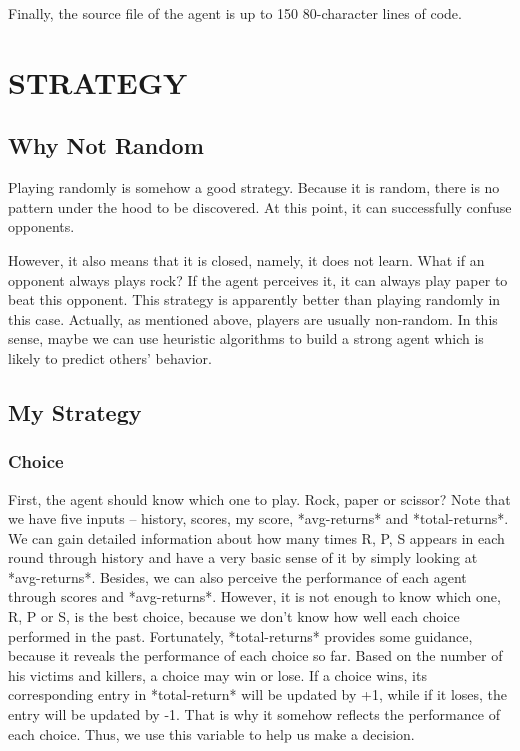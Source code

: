 \documentclass[10pt]{article}
\begin{document}
Finally, the source file of the agent is up to 150 80-character lines of code.

\section{STRATEGY}
\subsection{Why Not Random}
Playing randomly is somehow a good strategy. Because it is random, there is no pattern under the hood to be discovered. At this point, it can successfully confuse opponents. 

However, it also means that it is closed, namely, it does not learn. What if an opponent always plays rock? If the agent perceives it, it can always play paper to beat this opponent. This strategy is apparently better than playing randomly in this case. Actually, as mentioned above, players are usually non-random. In this sense, maybe we can use heuristic algorithms to build a strong agent which is likely to predict others' behavior.

\subsection{My Strategy}

\subsubsection{Choice}
First, the agent should know which one to play. Rock, paper or scissor? Note that we have five inputs -- history, scores, my score, *avg-returns* and *total-returns*. We can gain detailed information about how many times R, P, S appears in each round through history and have a very basic sense of it by simply looking at *avg-returns*. Besides, we can also perceive the performance of each agent through scores and *avg-returns*. However, it is not enough to know which one, R, P or S, is the best choice, because we don't know how well each choice performed in the past. Fortunately, *total-returns* provides some guidance, because it reveals the performance of each choice so far. Based on the number of his victims and killers, a choice may win or lose. If a choice wins, its corresponding entry in *total-return* will be updated by +1, while if it loses, the entry will be updated by -1. That is why it somehow reflects the performance of each choice. Thus, we use this variable to help us make a decision.
\end{document}
